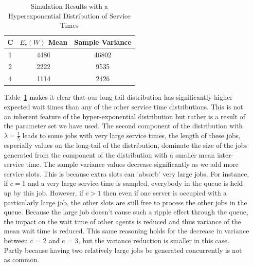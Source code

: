 \documentclass{article}
\begin{document}
    \begin{table}[h!]
        \centering
        \begin{tabular}{|c | c | c |}
            \hline
            C & $E_c(W)$ Mean & Sample Variance \\
            \hline\hline
            1 & 4480 & 46802 \\
            2 & 2222 & 9535 \\
            4 & 1114 & 2426 \\
            \hline
        \end{tabular}
        \caption{Simulation Results with a Hyperexponential Distribution of Service Times}
        \label{Table:hypexp}
    \end{table}

    Table~\ref{Table:hypexp} makes it clear that our long-tail distribution has significantly higher expected wait times than any of the other service time distributions. This is not an inherent feature of the hyper-exponential distribution but rather is a result of the parameter set we have used. The second component of the distribution with $\lambda = \frac{1}{5}$ leads to some jobs with very large service times, the length of these jobs, especially values on the long-tail of the distribution, dominate the size of the jobs generated from the component of the distribution with a smaller mean inter-service time. The sample variance values decrease significantly as we add more service slots. This is because extra slots can 'absorb' very large jobs. For instance, if $c = 1$ and a very large  service-time is sampled, everybody in the queue is held up by this job. However, if $c > 1$ then even if one server is occupied with a particularly large job, the other slots are still free to process the other jobs in the queue. Because the large job doesn't cause such a ripple effect through the queue, the impact on the wait time of other agents is reduced and thus variance of the mean wait time is reduced. This same reasoning holds for the decrease in variance between c = 2 and c = 3, but the variance reduction is smaller in this case. Partly because having two relatively large jobs be generated concurrently is not as common.
\end{document}
